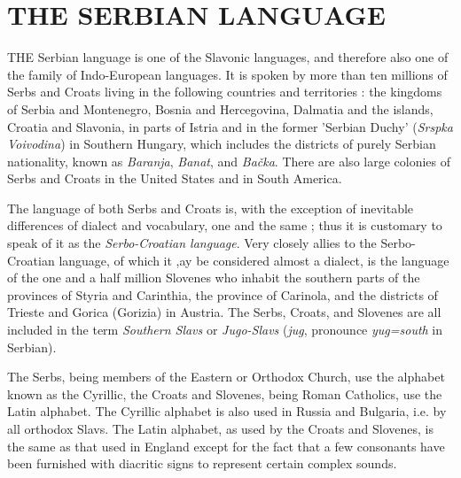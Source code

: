 \chapter{THE SERBIAN LANGUAGE}
        \indent T{\scriptsize HE} Serbian language is one of the Slavonic languages, and therefore also one of the family of
        Indo-European languages. It is spoken by more than ten millions of Serbs and
        Croats living in the following countries and territories : the kingdoms of
        Serbia and Montenegro, Bosnia and Hercegovina, Dalmatia and the islands,
        Croatia and Slavonia, in parts of Istria and in the former 'Serbian Duchy'
        (\textit{Srspka Voivodina}) in Southern Hungary, which includes the districts
        of purely Serbian nationality, known as \textit{Baranja}, \textit{Banat}, and
        \textit{Bačka}. There are also large colonies of Serbs and Croats in the United
        States and in South America. 

        The language of both Serbs and Croats is, with the exception of inevitable
        differences of dialect and vocabulary, one and the same ; thus it is customary
        to speak of it as the \textit{Serbo-Croatian language}. Very closely allies to
        the Serbo-Croatian language, of which it ,ay be considered almost a dialect, is
        the language of the one and a half million Slovenes who inhabit the southern
        parts of the provinces of Styria and Carinthia, the province of Carinola, and
        the districts of Trieste and Gorica (Gorizia) in Austria. The Serbs, Croats,
        and Slovenes are all included in the term \textit{Southern Slavs} or
        \textit{Jugo-Slavs} (\textit{jug}, pronounce \textit{yug=south} in Serbian).

        The Serbs, being members of the Eastern or Orthodox Church, use the alphabet
        known as the Cyrillic, the Croats and Slovenes, being Roman Catholics, use the
        Latin alphabet. The Cyrillic alphabet is also used in Russia and Bulgaria, i.e.
        by all orthodox Slavs. The Latin alphabet, as used by the Croats and Slovenes,
        is the same as that used in England except for the fact that a few consonants
        have been furnished with diacritic signs to represent certain complex sounds.


